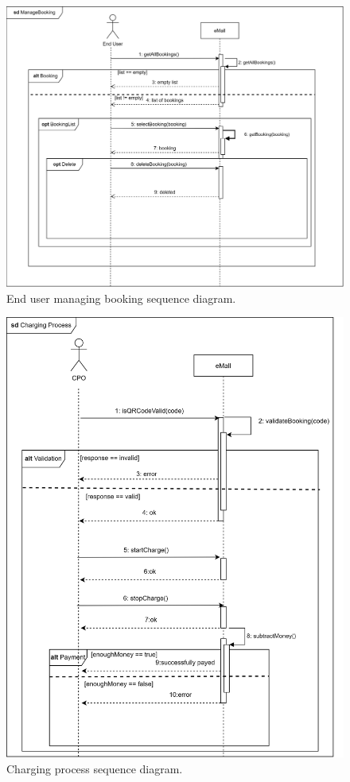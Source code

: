 \begin{figure}[H]
    \centering
    \includegraphics[width=\textwidth]{images/sd_manageBooking.png}
    \caption{End user managing booking sequence diagram.}
    \label{fig:sd_manage_booking}
\end{figure}
\begin{figure}[H]
    \centering
    \includegraphics[width=\textwidth]{images/sd_scan.png}
    \caption{Charging process sequence diagram.}
    \label{fig:sd_charging_process}
\end{figure}
